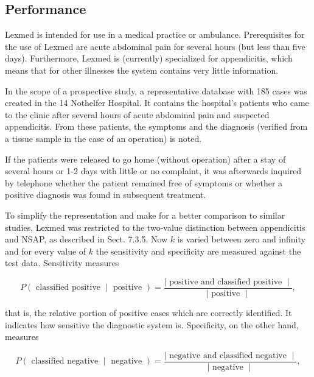 \documentclass[10pt]{book}
\begin{document}
\subsection{Performance}
Lexmed is intended for use in a medical practice or ambulance. Prerequisites for the use of Lexmed are acute abdominal pain for several hours (but less than five days). Furthermore, Lexmed is (currently) specialized for appendicitis, which means that for other illnesses the system contains very little information.

In the scope of a prospective study, a representative database with 185 cases was created in the 14 Nothelfer Hospital. It contains the hospital's patients who came to the clinic after several hours of acute abdominal pain and suspected appendicitis. From these patients, the symptoms and the diagnosis (verified from a tissue sample in the case of an operation) is noted.

If the patients were released to go home (without operation) after a stay of several hours or 1-2 days with little or no complaint, it was afterwards inquired by telephone whether the patient remained free of symptoms or whether a positive diagnosis was found in subsequent treatment.

To simplify the representation and make for a better comparison to similar studies, Lexmed was restricted to the two-value distinction between appendicitis and NSAP, as described in Sect. 7.3.5. Now $k$ is varied between zero and infinity\\
and for every value of $k$ the sensitivity and specificity are measured against the test data. Sensitivity measures


\begin{equation*}
P(\text { classified positive } \mid \text { positive })=\frac{\mid \text { positive and classified positive } \mid}{\mid \text { positive } \mid}, \tag{7.16}
\end{equation*}


that is, the relative portion of positive cases which are correctly identified. It indicates how sensitive the diagnostic system is. Specificity, on the other hand, measures


\begin{equation*}
P(\text { classified negative } \mid \text { negative })=\frac{\mid \text { negative and classified negative } \mid}{\mid \text { negative } \mid}, \tag{7.17}
\end{equation*}
\end{document}
